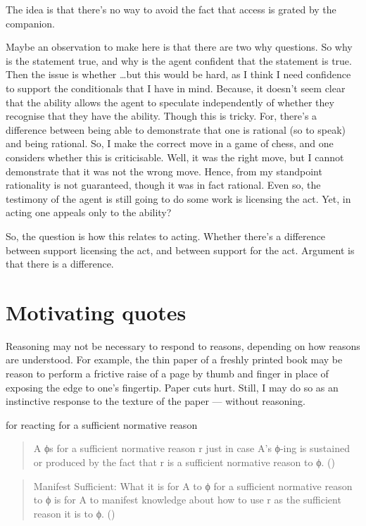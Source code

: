 \documentclass[10pt]{article}
\begin{document}
{
  \color{red}
  The idea is that there's no way to avoid the fact that access is grated by the companion.

  Maybe an observation to make here is that there are two why questions.
  So why is the statement true, and why is the agent confident that the statement is true.
  Then the issue is whether \dots but this would be hard, as I think I need confidence to support the conditionals that I have in mind.
  Because, it doesn't seem clear that the ability allows the agent to speculate independently of whether they recognise that they have the ability.
  Though this is tricky.
  For, there's a difference between being able to demonstrate that one is rational (so to speak) and being rational.
  So, I make the correct move in a game of chess, and one considers whether this is criticisable.
  Well, it was the right move, but I cannot demonstrate that it was not the wrong move.
  Hence, from my standpoint rationality is not guaranteed, though it was in fact rational.
  Even so, the testimony of the agent is still going to do some work is licensing the act.
  Yet, in acting one appeals only to the ability?

  So, the question is how this relates to acting.
  Whether there's a difference between support licensing the act, and between support for the act.
  Argument is that there is a difference.
}


\section{Motivating quotes}
\label{sec:motivating-quotes}

Reasoning may not be necessary to respond to reasons, depending on how reasons are understood.
For example, the thin paper of a freshly printed book may be reason to perform a frictive raise of a page by thumb and finger in place of exposing the edge to one's fingertip.
Paper cuts hurt.
Still, I may do so as an instinctive response to the texture of the paper --- without reasoning.


for reacting for a sufficient normative reason
\begin{quote}
  A ϕs for a sufficient normative reason r just in case A’s ϕ-ing is sustained or produced by the fact that r is a sufficient normative reason to ϕ.\nolinebreak
  \mbox{}\hfill\mbox{(\citeyear[142]{Lord:2018aa})}
\end{quote}

\begin{quote}
  Manifest Sufficient: What it is for A to ϕ for a sufficient normative reason to ϕ is for A to manifest knowledge about how to use r as the sufficient reason it is to ϕ.\nolinebreak
  \mbox{}\hfill\mbox{(\citeyear[143]{Lord:2018aa})}
\end{quote}
\end{document}
